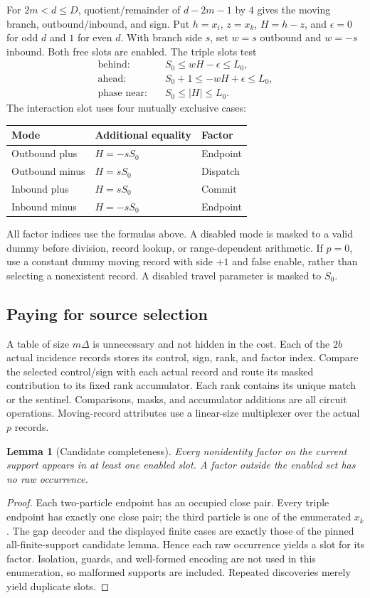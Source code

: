 \documentclass[11pt,a4paper]{article}
\numberwithin{equation}{section}
\newtheorem{lemma}[theorem]{Lemma}
\begin{document}
For $2m<d\leq D$, quotient/remainder of $d-2m-1$ by $4$ gives the moving branch, outbound/inbound, and sign. Put $h=x_i$, $z=x_k$, $H=h-z$, and $\epsilon=0$ for odd $d$ and $1$ for even $d$. With branch side $s$, set $w=s$ outbound and $w=-s$ inbound. Both free slots are enabled. The triple slots test
\begin{align*}
\text{behind:}&\quad S_0\leq wH-\epsilon\leq L_0,\\
\text{ahead:}&\quad S_0+1\leq-wH+\epsilon\leq L_0,\\
\text{phase near:}&\quad S_0\leq |H|\leq L_0.
\end{align*}
The interaction slot uses four mutually exclusive cases:
\begin{center}
\begin{tabular}{@{}lll@{}}\toprule
Mode & Additional equality & Factor\\\midrule
Outbound plus & $H=-sS_0$ & Endpoint\\
Outbound minus & $H=sS_0$ & Dispatch\\
Inbound plus & $H=sS_0$ & Commit\\
Inbound minus & $H=-sS_0$ & Endpoint\\\bottomrule
\end{tabular}
\end{center}
All factor indices use the formulas above. A disabled mode is masked to a valid dummy before division, record lookup, or range-dependent arithmetic. If $p=0$, use a constant dummy moving record with side $+1$ and false enable, rather than selecting a nonexistent record. A disabled travel parameter is masked to $S_0$.

\subsection{Paying for source selection}
A table of size $m\Delta$ is unnecessary and not hidden in the cost. Each of the $2b$ actual incidence records stores its control, sign, rank, and factor index. Compare the selected control/sign with each actual record and route its masked contribution to its fixed rank accumulator. Each rank contains its unique match or the sentinel. Comparisons, masks, and accumulator additions are all circuit operations. Moving-record attributes use a linear-size multiplexer over the actual $p$ records.

\begin{lemma}[Candidate completeness]\label{fpa:eb:lem:candidates}
Every nonidentity factor on the current support appears in at least one enabled slot. A factor outside the enabled set has no raw occurrence.
\end{lemma}
\begin{proof}
Each two-particle endpoint has an occupied close pair. Every triple endpoint has exactly one close pair; the third particle is one of the enumerated $x_k$. The gap decoder and the displayed finite cases are exactly those of the pinned all-finite-support candidate lemma. Hence each raw occurrence yields a slot for its factor. Isolation, guards, and well-formed encoding are not used in this enumeration, so malformed supports are included. Repeated discoveries merely yield duplicate slots.
\end{proof}
\end{document}
